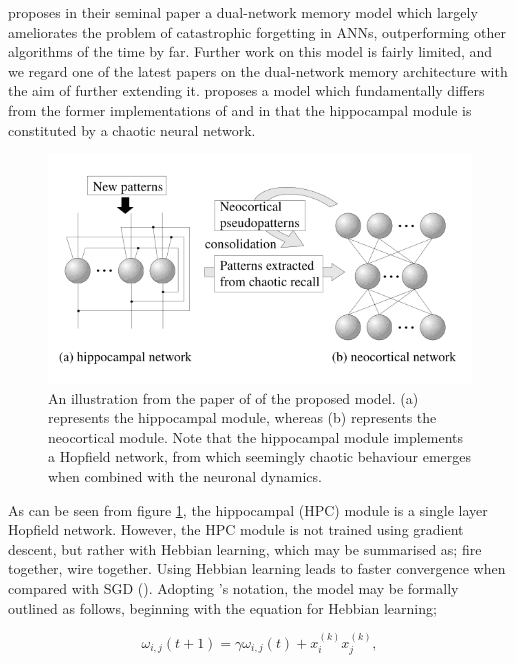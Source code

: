 \cite{McClelland1995} proposes in their seminal paper a dual-network memory model which largely ameliorates the problem of catastrophic forgetting in ANNs, outperforming other algorithms of the time by far. Further work on this model is fairly limited, and we regard one of the latest papers on the dual-network memory architecture with the aim of further extending it. \cite{Hattori2010} proposes a model which fundamentally differs from the former implementations of \cite{French1997} and \cite{Ans1997} in that the hippocampal module is constituted by a chaotic neural network.

\begin{figure}
\centering
\includegraphics[width=12cm]{fig/hattori2010_model_structure}
\caption{An illustration from the paper of \cite{Hattori2010} of the proposed model. (a) represents the hippocampal module, whereas (b) represents the neocortical module. Note that the hippocampal module implements a Hopfield network, from which seemingly chaotic behaviour emerges when combined with the neuronal dynamics.}
\label{fig:hattori2010_model_structure}
\end{figure}

As can be seen from figure \ref{fig:hattori2010_model_structure}, the hippocampal (HPC) module is a single layer Hopfield network. However, the HPC module is not trained using gradient descent, but rather with Hebbian learning, which may be summarised as; fire together, wire together. Using Hebbian learning leads to faster convergence when compared with SGD (\cite{Hattori2010}). Adopting \cite{Hattori2010}'s notation, the model may be formally outlined as follows, beginning with the equation for Hebbian learning;

\begin{equation}\label{hattori_hebbian_learning}
    \omega_{i,j}(t+1) = \gamma \omega_{i,j}(t) + x_i^{(k)} x_j^{(k)},
\end{equation}

